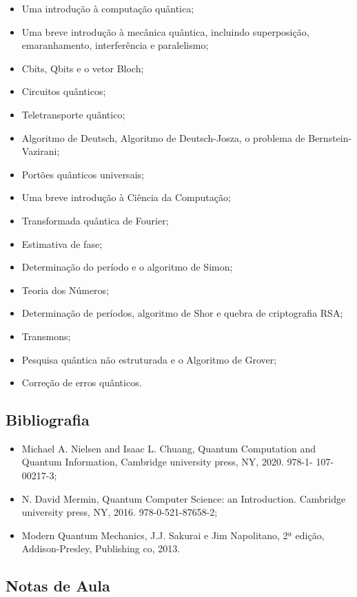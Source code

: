 \documentclass[12pt]{article}
\begin{document}
\begin{itemize}
	\item Uma introdução à computação quântica;
	\item Uma breve introdução à mecânica quântica, incluindo superposição, emaranhamento, interferência e paralelismo;
	\item Cbits, Qbits e o vetor Bloch;
	\item Circuitos quânticos;
	\item Teletransporte quântico;
	\item Algoritmo de Deutsch, Algoritmo de Deutsch-Josza, o problema de Bernstein-Vazirani;
	\item Portões quânticos universais;
	\item Uma breve introdução à Ciência da Computação;
	\item Transformada quântica de Fourier;
	\item Estimativa de fase;
	\item Determinação do período e o algoritmo de Simon;
	\item Teoria dos Números;
	\item Determinação de períodos, algoritmo de Shor e quebra de criptografia RSA;
	\item Transmons;
	\item Pesquisa quântica não estruturada e o Algoritmo de Grover;
	\item Correção de erros quânticos.
\end{itemize}

\subsection{Bibliografia}
\begin{itemize}
	\item Michael A. Nielsen and Isaac L. Chuang, Quantum
	Computation and Quantum Information, Cambridge university press, NY, 2020. 978-1-
	107-00217-3;
	\item N. David Mermin, Quantum Computer Science: an Introduction. Cambridge
	university press, NY, 2016. 978-0-521-87658-2;
	\item Modern Quantum Mechanics, J.J. Sakurai
	e Jim Napolitano, 2ª edição, Addison-Presley, Publishing co, 2013. 
\end{itemize}

\subsection{Notas de Aula}
\end{document}

